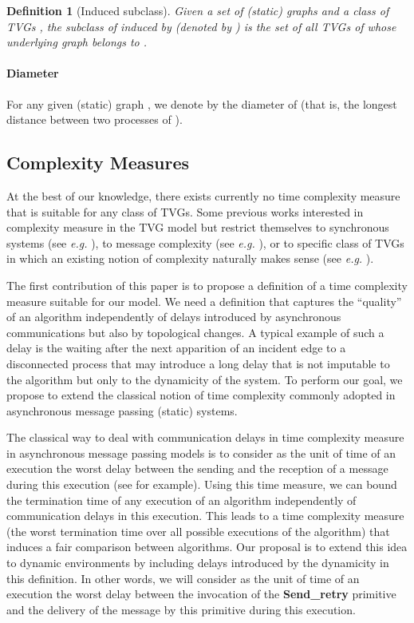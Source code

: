 \documentclass{article}
\newtheorem{definition}{Definition}
\begin{document}
\begin{definition}[Induced subclass]\label{def:inducedsubclass}
Given a set of (static) graphs  and a class of TVGs , the subclass of  induced by  (denoted by ) is the set of all TVGs of  whose underlying graph belongs to .
\end{definition}

\paragraph{Diameter}

For any given (static) graph , we denote by  the diameter of  (that is, the longest distance between two processes of ).

\subsection{Complexity Measures}\label{sub:complexity}

At the best of our knowledge, there exists currently no time complexity measure that is suitable for any class of TVGs. Some previous works interested in complexity measure in the TVG model but restrict themselves to synchronous systems (see \emph{e.g.} \cite{KOM11c,KLO10c}), to message complexity (see \emph{e.g.} \cite{CFMS10c}), or to specific class of TVGs in which an existing notion of complexity naturally makes sense (see \emph{e.g.} \cite{IKW14c,CFMS10c}).

The first contribution of this paper is to propose a definition of a time complexity measure suitable for our model. We need a definition that captures the ``quality'' of an algorithm independently of delays introduced by asynchronous communications but also by topological changes. A typical example of such a delay is the waiting after the next apparition of an incident edge to a disconnected process that may introduce a long delay that is not imputable to the algorithm but only to the dynamicity of the system. To perform our goal, we propose to extend the classical notion of time complexity commonly adopted in asynchronous message passing (static) systems.

The classical way to deal with communication delays in time complexity measure in asynchronous message passing models is to consider as the unit of time of an execution the worst delay between the sending and the reception of a message during this execution (see \cite{AW04} for example). Using this time measure, we can bound the termination time of any execution of an algorithm independently of communication delays in this execution. This leads to a time complexity measure (the worst termination time over all possible executions of the algorithm) that induces a fair comparison between algorithms. Our proposal is to extend this idea to dynamic environments by including delays introduced by the dynamicity in this definition. In other words, we will consider as the unit of time of an execution the worst delay between the invocation of the \textbf{Send\_retry} primitive and the delivery of the message by this primitive during this execution.
\end{document}
